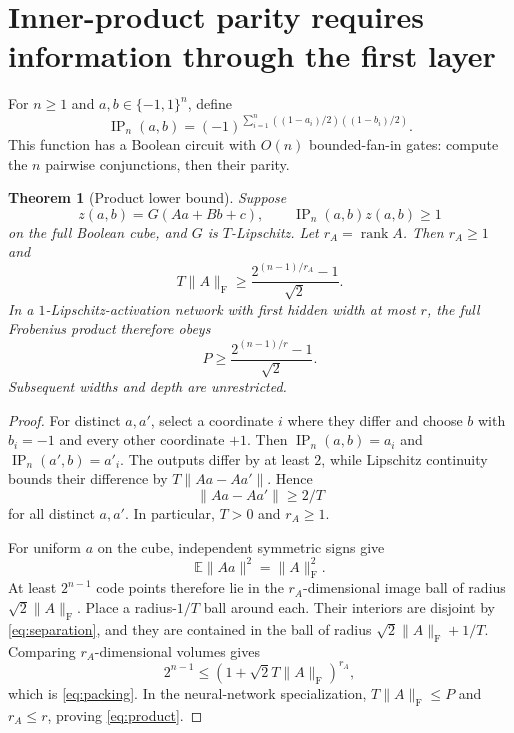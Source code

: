 \documentclass[11pt]{article}
\newtheorem{theorem}{Theorem}[section]
\theoremstyle{remark}\newtheorem{remark}[theorem]{Remark}
\newcommand{\E}{\mathbb E}
\newcommand{\F}{\mathrm F}
\newcommand{\IP}{\operatorname{IP}}
\newcommand{\norm}[1]{\lVert #1\rVert}
\begin{document}
\section{Inner-product parity requires information through the first layer}
For $n\ge1$ and $a,b\in\{-1,1\}^n$, define
\[
 \IP_n(a,b)=(-1)^{\sum_{i=1}^n((1-a_i)/2)((1-b_i)/2)}.
\]
This function has a Boolean circuit with $O(n)$ bounded-fan-in gates:
compute the $n$ pairwise conjunctions, then their parity.

\begin{theorem}[Product lower bound]\label{thm:packing}
Suppose
\[
 z(a,b)=G(Aa+Bb+c),\qquad \IP_n(a,b)z(a,b)\ge1
\]
on the full Boolean cube, and $G$ is $T$-Lipschitz. Let
$r_A=\operatorname{rank}A$. Then $r_A\ge1$ and
\begin{equation}\label{eq:packing}
 T\norm A_\F\ge\frac{2^{(n-1)/r_A}-1}{\sqrt2}.
\end{equation}
In a $1$-Lipschitz-activation network with first hidden width at most $r$,
the full Frobenius product therefore obeys
\begin{equation}\label{eq:product}
 P\ge\frac{2^{(n-1)/r}-1}{\sqrt2}.
\end{equation}
Subsequent widths and depth are unrestricted.
\end{theorem}
\begin{proof}
For distinct $a,a'$, select a coordinate $i$ where they differ and choose
$b$ with $b_i=-1$ and every other coordinate $+1$. Then
$\IP_n(a,b)=a_i$ and $\IP_n(a',b)=a'_i$. The outputs differ by at least
$2$, while Lipschitz continuity bounds their difference by
$T\norm{Aa-Aa'}$. Hence
\begin{equation}\label{eq:separation}
 \norm{Aa-Aa'}\ge2/T
\end{equation}
for all distinct $a,a'$. In particular, $T>0$ and $r_A\ge1$.

For uniform $a$ on the cube, independent symmetric signs give
\[
 \E\norm{Aa}^2=\norm A_\F^2.
\]
At least $2^{n-1}$ code points therefore lie in the $r_A$-dimensional
image ball of radius $\sqrt2\norm A_\F$. Place a radius-$1/T$ ball around
each. Their interiors are disjoint by \eqref{eq:separation}, and they
are contained in the ball of radius $\sqrt2\norm A_\F+1/T$. Comparing
$r_A$-dimensional volumes gives
\[
 2^{n-1}\le(1+\sqrt2 T\norm A_\F)^{r_A},
\]
which is \eqref{eq:packing}. In the neural-network specialization,
$T\norm A_\F\le P$ and $r_A\le r$, proving \eqref{eq:product}.
\end{proof}
\end{document}
